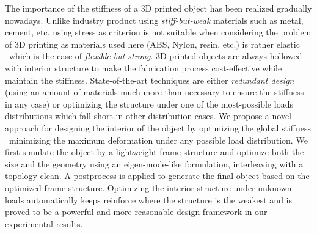 


The importance of the stiffness of a 3D printed object has been realized gradually nowadays. Unlike industry product using \textit{stiff-but-weak} materials such as metal, cement, etc. using stress as criterion is not suitable when considering the problem of 3D printing as materials used here (ABS, Nylon, resin, etc.) is rather elastic \textendash \  which is the case of \textit{flexible-but-strong}. 3D printed objects are always hollowed with interior structure to make the fabrication process cost-effective while maintain the stiffness. State-of-the-art techniques are either \textit{redundant design} (using an amount of materials much more than necessary to ensure the stiffness in any case) or optimizing the structure under one of the most-possible loads distributions which fall short in other distribution cases. We propose a novel approach for designing the interior of the object by optimizing the global stiffness \textendash \  minimizing the maximum deformation under any possible load distribution. We first simulate the object by a lightweight frame structure and optimize both the size and the geometry using an eigen-mode-like formulation, interleaving with a topology clean. A postprocess is applied to generate the final object based on the optimized frame structure. Optimizing the interior structure under unknown loads automatically keeps reinforce where the structure is the weakest and is proved to be a powerful and more reasonable design framework in our experimental results.

